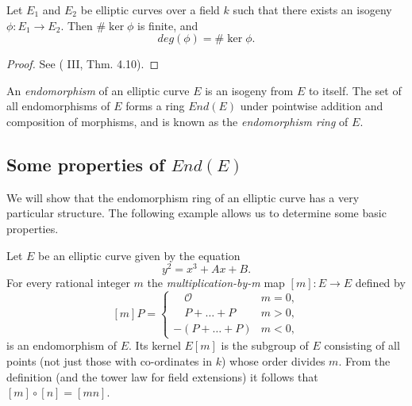 \begin{prop}
  \label{prop:deg-phi-equals-sizeof-kernel}
  Let $E_{1}$ and $E_{2}$ be elliptic curves over a field $k$ such that there exists
  an isogeny $\phi : E_{1} \rightarrow E_{2}$.  Then $\# \ker{\phi}$ is finite, and
  \begin{equation*}
    deg(\phi) = \# \ker{\phi}.
  \end{equation*}
\end{prop}
\begin{proof}
  See (\cite{silverman86} III, Thm. 4.10).
\end{proof}

An \emph{endomorphism} of an elliptic curve $E$ is an isogeny from $E$ to itself.
The set of all endomorphisms of $E$ forms a ring $End(E)$ under pointwise addition
and composition of morphisms, and is known as the \emph{endomorphism ring} of $E$.

\subsection{Some properties of $End(E)$}
\label{sec:some-properties-ende}

We will show that the endomorphism ring of an elliptic curve has a very particular
structure.  The following example allows us to determine some basic properties.

\begin{example}
  \label{ex:mult-by-m}
  Let $E$ be an elliptic curve given by the equation
  \begin{equation*}
    y^{2} = x^{3} + Ax + B.
  \end{equation*}
  For every rational integer $m$ the
  \emph{multiplication-by-m} map $\left[m\right] \colon E \rightarrow E$ defined by
  \begin{equation*}
    \left[ m \right] P =
    \begin{cases}
      \quad \mathcal{O} & m = 0,\\
      \quad P + \ldots + P & m > 0,\\
      - \left( P + \ldots + P \right) & m < 0,
    \end{cases}
  \end{equation*}
  is an endomorphism of $E$.  Its kernel $E[m]$ is the subgroup of $E$ consisting of
  all points (not just those with co-ordinates in $k$) whose order divides $m$.  From the definition (and the tower law for field extensions) it
  follows that $\left[m\right] \circ \left[n\right] = \left[mn\right]$.
\end{example}

